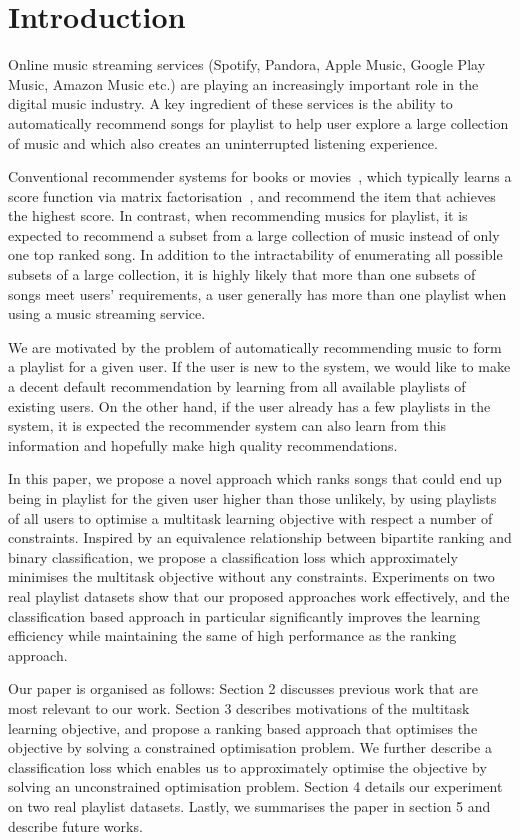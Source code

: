 \section{Introduction}
\label{sec:intro}
Online music streaming services (\eg Spotify, Pandora, Apple Music, Google Play Music, Amazon Music etc.) 
are playing an increasingly important role in the digital music industry.
A key ingredient of these services is the ability to automatically recommend songs for playlist
to help user explore a large collection of music and which also creates an uninterrupted listening experience.

Conventional recommender systems for books or movies~\citep{Sarwar:2001,Netflix},
which typically learns a score function via matrix factorisation~\citep{Koren:2009},
and recommend the item that achieves the highest score.
%
In contrast, when recommending musics for playlist, 
it is expected to recommend a subset from a large collection of music
instead of only one top ranked song.
In addition to the intractability of enumerating all possible subsets of a large collection,
it is highly likely that more than one subsets of songs meet users' requirements,
\eg a user generally has more than one playlist when using a music streaming service.

We are motivated by the problem of automatically recommending music to form a playlist for a given user.
If the user is new to the system, we would like to make a decent default recommendation by learning from 
all available playlists of existing users.
On the other hand, if the user already has a few playlists in the system, it is expected the recommender 
system can also learn from this information and hopefully make high quality recommendations.

In this paper, we propose a novel approach which ranks songs that could end up being in playlist for the 
given user higher than those unlikely, by using playlists of all users to optimise a multitask learning 
objective with respect a number of constraints.
Inspired by an equivalence relationship between bipartite ranking and binary classification,
we propose a classification loss which approximately minimises the multitask objective without 
any constraints.
Experiments on two real playlist datasets show that our proposed approaches work effectively,
and the classification based approach in particular significantly improves the learning efficiency 
while maintaining the same of high performance as the ranking approach.

Our paper is organised as follows:
Section 2 discusses previous work that are most relevant to our work.
Section 3 describes motivations of the multitask learning objective, and propose a ranking based approach 
that optimises the objective by solving a constrained optimisation problem.
We further describe a classification loss which enables us to approximately optimise the objective by
solving an unconstrained optimisation problem.
Section 4 details our experiment on two real playlist datasets.
Lastly, we summarises the paper in section 5 and describe future works.
